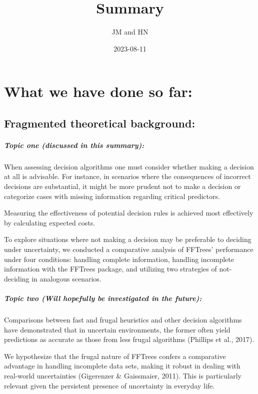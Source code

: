\documentclass[
]{article}
\title{Summary}
\author{JM and HN}
\date{2023-08-11}
\begin{document}
\maketitle

\hypertarget{what-we-have-done-so-far}{%
\section{What we have done so far:}\label{what-we-have-done-so-far}}

\hypertarget{fragmented-theoretical-background}{%
\subsection{Fragmented theoretical
background:}\label{fragmented-theoretical-background}}

\hypertarget{topic-one-discussed-in-this-summary}{%
\subparagraph{Topic one (discussed in this
summary):}\label{topic-one-discussed-in-this-summary}}

When assessing decision algorithms one must consider whether making a
decision at all is advisable. For instance, in scenarios where the
consequences of incorrect decisions are substantial, it might be more
prudent not to make a decision or categorize cases with missing
information regarding critical predictors.

Measuring the effectiveness of potential decision rules is achieved most
effectively by calculating expected costs.

To explore situations where not making a decision may be preferable to
deciding under uncertainty, we conducted a comparative analysis of
FFTrees' performance under four conditions: handling complete
information, handling incomplete information with the FFTrees package,
and utilizing two strategies of not-deciding in analogous scenarios.

\hypertarget{topic-two-will-hopefully-be-investigated-in-the-future}{%
\subparagraph{Topic two (Will hopefully be investigated in the
future):}\label{topic-two-will-hopefully-be-investigated-in-the-future}}

Comparisons between fast and frugal heuristics and other decision
algorithms have demonstrated that in uncertain environments, the former
often yield predictions as accurate as those from less frugal algorithms
(Phillips et al., 2017).

We hypothesize that the frugal nature of FFTrees confers a comparative
advantage in handling incomplete data sets, making it robust in dealing
with real-world uncertainties (Gigerenzer \& Gaissmaier, 2011). This is
particularly relevant given the persistent presence of uncertainty in
everyday life.
\end{document}
